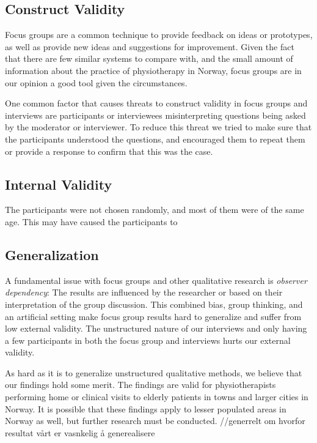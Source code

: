 \subsection{Construct Validity}

Focus groups are a common technique to provide feedback on ideas or prototypes, as well as provide new ideas and suggestions for improvement. Given the fact that there are few similar systems to compare with, and the small amount of information about the practice of physiotherapy in Norway, focus groups are in our opinion a good tool given the circumstances.  

One common factor that causes threats to construct validity in focus groups and interviews are participants or interviewees misinterpreting questions being asked by the moderator or interviewer. To reduce this threat we tried to make sure that the participants understood the questions, and encouraged them to repeat them or provide a response to confirm that this was the case.

\subsection{Internal Validity}
The participants were not chosen randomly, and most of them were of the same age. This may have caused the participants to 

\subsection{Generalization}
A fundamental issue with focus groups and other qualitative research is \textit{observer dependency}: The results are influenced by the researcher or based on their interpretation of the group discussion. This combined bias, group thinking, and an artificial setting make focus group results hard to generalize and suffer from low external validity. The unstructured nature of our interviews and only having a few participants in both the focus group and interviews hurts our external validity.

As hard as it is to generalize unstructured qualitative methods, we believe that our findings hold some merit. The findings are valid for physiotherapists performing home or clinical visits to elderly patients in towns and larger cities in Norway. It is possible that these findings apply to lesser populated areas in Norway as well, but further research must be conducted.
//generrelt om hvorfor resultat vårt er vasnkelig å generealisere

